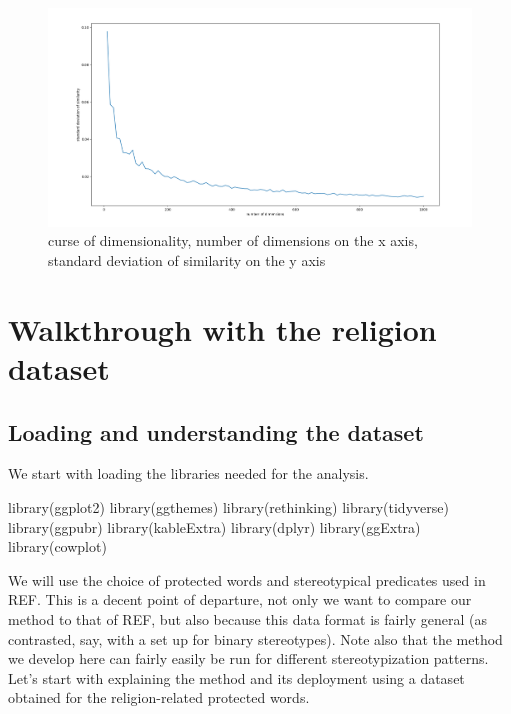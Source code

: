 \documentclass[
  12pt,
]{book}
\newenvironment{Shaded}{\begin{snugshade}}{\end{snugshade}}
\newcommand{\FunctionTok}[1]{\textcolor[rgb]{0.00,0.00,0.00}{#1}}
\newcommand{\NormalTok}[1]{#1}
\begin{document}
\begin{figure}
\centering
\includegraphics{../images/curseOfDimensionality.png}
\caption{curse of dimensionality, number of dimensions on the x axis, standard deviation of similarity on the y axis}
\end{figure}

\hypertarget{walkthrough-with-the-religion-dataset}{%
\chapter{Walkthrough with the religion dataset}\label{walkthrough-with-the-religion-dataset}}

\hypertarget{loading-and-understanding-the-dataset}{%
\section{Loading and understanding the dataset}\label{loading-and-understanding-the-dataset}}

We start with loading the libraries needed for the analysis.

\footnotesize

\begin{Shaded}
\begin{Highlighting}[]
\FunctionTok{library}\NormalTok{(ggplot2)}
\FunctionTok{library}\NormalTok{(ggthemes)}
\FunctionTok{library}\NormalTok{(rethinking)}
\FunctionTok{library}\NormalTok{(tidyverse)}
\FunctionTok{library}\NormalTok{(ggpubr)}
\FunctionTok{library}\NormalTok{(kableExtra)}
\FunctionTok{library}\NormalTok{(dplyr)}
\FunctionTok{library}\NormalTok{(ggExtra)}
\FunctionTok{library}\NormalTok{(cowplot)}
\end{Highlighting}
\end{Shaded}

\normalsize

We will use the choice of protected words and stereotypical predicates used in REF. This is a decent point of departure, not only we want to compare our method to that of REF, but also because this data format is fairly general (as contrasted, say, with a set up for binary stereotypes). Note also that the method we develop here can fairly easily be run for different stereotypization patterns. Let's start with explaining the method and its deployment using a dataset obtained for the religion-related protected words.
\end{document}
